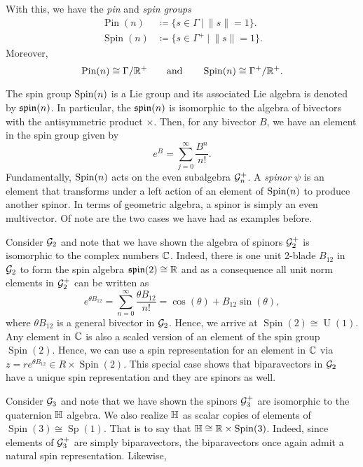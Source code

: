 With this, we have the \emph{pin} and \emph{spin groups}
\begin{align*}
    \operatorname{Pin}(n) &\coloneqq \{s\in \Gamma ~\vert~ \|s\|=1\}.\\
    \operatorname{Spin}(n) &\coloneqq \{s\in \Gamma^+ ~\vert~ \|s\|=1\}.
\end{align*}
Moreover,
\[
\operatorname{Pin}(n) \cong \Gamma/\mathbb{R}^+ \qquad \textrm{and} \qquad \operatorname{Spin}(n) \cong \Gamma^+/\mathbb{R}^+.
\]

The spin group $\operatorname{Spin}(n)$ is a Lie group and its associated Lie algebra is denoted by $\mathfrak{spin}(n)$. In particular, the $\mathfrak{spin}(n)$ is isomorphic to the algebra of bivectors with the antisymmetric product $\times$.  Then, for any bivector $B$, we have an element in the spin group given by
\[
e^{B} = \sum_{j=0}^\infty \frac{B^n}{n!}.
\]
Fundamentally, $\operatorname{Spin}(n)$ acts on the even subalgebra $\mathcal{G}_n^+$. A \emph{spinor} $\psi$ is an element that transforms under a left action of an element of $\operatorname{Spin}(n)$ to produce another spinor.  In terms of geometric algebra, a spinor is simply an even multivector.  Of note are the two cases we have had as examples before. 

\begin{example}
    Consider $\mathcal{G}_2$ and note that we have shown the algebra of spinors $\mathcal{G}_2^+$ is isomorphic to the complex numbers $\mathbb{C}$.  Indeed, there is one unit 2-blade $B_{12}$ in $\mathcal{G}_2$ to form the spin algebra $\mathfrak{spin}(2) \cong \mathbb{R}$ and as a consequence all unit norm elements in $\mathcal{G}_2^+$ can be written as
    \[
       e^{\theta B_{12}} = \sum_{n=0}^\infty \frac{\theta B_{12}}{n!} = \cos(\theta)+B_{12}\sin(\theta),
    \]
    where $\theta B_{12}$ is a general bivector in $\mathcal{G}_2$.  Hence, we arrive at $\operatorname{Spin}(2)\cong \operatorname{U}(1)$. Any element in $\mathbb{C}$ is also a scaled version of an element of the spin group $\operatorname{Spin}(2)$. Hence, we can use a spin representation for an element in $\mathbb{C}$ via $z=re^{\theta B_{12}} \in R\times \operatorname{Spin}(2)$.  This special case shows that biparavectors in $\mathcal{G}_2$ have a unique spin representation and they are spinors as well.
\end{example}

\begin{example}
    Consider $\mathcal{G}_3$ and note that we have shown the spinors $\mathcal{G}_3^+$ are isomorphic to the quaternion $\mathbb{H}$ algebra.  We also realize $\mathbb{H}$ as scalar copies of elements of $\operatorname{Spin}(3) \cong \operatorname{Sp}(1)$.  That is to say that $\mathbb{H} \cong \mathbb{R} \times \operatorname{Spin}(3)$. Indeed, since elements of $\mathcal{G}_3^+$ are simply biparavectors, the biparavectors once again admit a natural spin representation. Likewise, 
\end{example}

